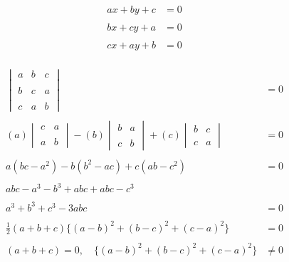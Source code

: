 \documentclass{article}
\begin{document}
	\\
	\begin{align*}
		ax+by+c&=0\\
		\\
		bx+cy+a&=0\\
		\\
		cx+ay+b&=0
	\end{align*}
	\\ 
	\begin{align*}
		\begin{vmatrix}
			a& b&c\\
			\\
			b & c &a\\
			\\
			c& a &b
		\end{vmatrix}&=0\\
		\\
		(a)	\begin{vmatrix}
			c &a\\
			\\
			a &b
		\end{vmatrix}-(b)	\begin{vmatrix}
			b &a\\
			\\
			c &b
		\end{vmatrix}+(c)	\begin{vmatrix}
			b &c\\
			\\
			c &a
		\end{vmatrix}&=0\\
		\\
		a(bc-a^2)-b(b^2-ac)+c(ab-c^2)&=0\\
		\\
		abc-a^3-b^3+abc+abc-c^3\\
		\\
		a^3+b^3+c^3-3abc&=0\\
		\\
		\frac{1}{2}(a+b+c)\{(a-b)^2+(b-c)^2+(c-a)^2\}&=0\\
		\\
		(a+b+c)=0,\quad \{(a-b)^2+(b-c)^2+(c-a)^2\}&\ne 0
	\end{align*}
\end{document}
